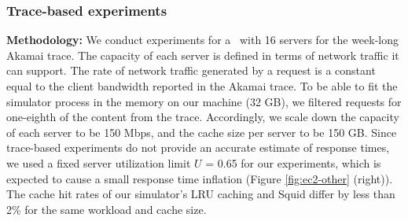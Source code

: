 
\subsubsection{Trace-based experiments}
\label{sec:simulation}

\textbf{Methodology:} We conduct experiments for a \cdc\ with 16 servers for the week-long Akamai trace. The capacity of each server is defined in terms of network traffic it can support. The rate of network traffic generated by a request is a constant equal to the client bandwidth reported in the Akamai trace. To be able to fit the simulator process in the memory on our machine (32 GB), we filtered requests for one-eighth of the content from the trace. Accordingly, we scale down  the capacity of each server to be 150 Mbps, and the cache size per server to be 150 GB. Since trace-based experiments do not provide an accurate estimate of response times, we used a fixed server utilization limit $U$ = 0.65 for our experiments, which is expected to cause a small response time inflation (Figure \ref{fig:ec2-other} (right)). 
The cache hit rates of our simulator's LRU caching and Squid differ by less than 2\% for the same workload and cache size. 


